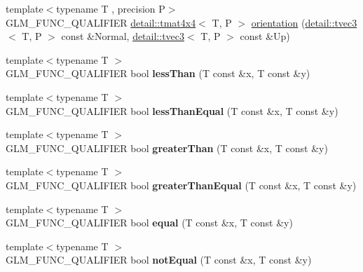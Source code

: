 \begin{DoxyCompactItemize}
\item 
{\footnotesize template$<$typename T , precision P$>$ }\\G\+L\+M\+\_\+\+F\+U\+N\+C\+\_\+\+Q\+U\+A\+L\+I\+F\+I\+ER \hyperlink{structglm_1_1detail_1_1tmat4x4}{detail\+::tmat4x4}$<$ T, P $>$ \hyperlink{group__gtx__rotate__vector_gac80aaf3b2af70c7f03f1077d4b6ac507}{orientation} (\hyperlink{structglm_1_1detail_1_1tvec3}{detail\+::tvec3}$<$ T, P $>$ const \&Normal, \hyperlink{structglm_1_1detail_1_1tvec3}{detail\+::tvec3}$<$ T, P $>$ const \&Up)
\item 
{\footnotesize template$<$typename T $>$ }\\G\+L\+M\+\_\+\+F\+U\+N\+C\+\_\+\+Q\+U\+A\+L\+I\+F\+I\+ER bool {\bfseries less\+Than} (T const \&x, T const \&y)\hypertarget{namespaceglm_a6f2a3cef357dbf21b5fc90aded289ba1}{}\label{namespaceglm_a6f2a3cef357dbf21b5fc90aded289ba1}

\item 
{\footnotesize template$<$typename T $>$ }\\G\+L\+M\+\_\+\+F\+U\+N\+C\+\_\+\+Q\+U\+A\+L\+I\+F\+I\+ER bool {\bfseries less\+Than\+Equal} (T const \&x, T const \&y)\hypertarget{namespaceglm_a299eb11fb67637d37144dc0fcc6c6ff3}{}\label{namespaceglm_a299eb11fb67637d37144dc0fcc6c6ff3}

\item 
{\footnotesize template$<$typename T $>$ }\\G\+L\+M\+\_\+\+F\+U\+N\+C\+\_\+\+Q\+U\+A\+L\+I\+F\+I\+ER bool {\bfseries greater\+Than} (T const \&x, T const \&y)\hypertarget{namespaceglm_ae567b870c79fb61cf069d489133eaf48}{}\label{namespaceglm_ae567b870c79fb61cf069d489133eaf48}

\item 
{\footnotesize template$<$typename T $>$ }\\G\+L\+M\+\_\+\+F\+U\+N\+C\+\_\+\+Q\+U\+A\+L\+I\+F\+I\+ER bool {\bfseries greater\+Than\+Equal} (T const \&x, T const \&y)\hypertarget{namespaceglm_a03e93d49cec76267c3e11fd68381639a}{}\label{namespaceglm_a03e93d49cec76267c3e11fd68381639a}

\item 
{\footnotesize template$<$typename T $>$ }\\G\+L\+M\+\_\+\+F\+U\+N\+C\+\_\+\+Q\+U\+A\+L\+I\+F\+I\+ER bool {\bfseries equal} (T const \&x, T const \&y)\hypertarget{namespaceglm_a9943cfbeef0a00a2becb541e9e3818ed}{}\label{namespaceglm_a9943cfbeef0a00a2becb541e9e3818ed}

\item 
{\footnotesize template$<$typename T $>$ }\\G\+L\+M\+\_\+\+F\+U\+N\+C\+\_\+\+Q\+U\+A\+L\+I\+F\+I\+ER bool {\bfseries not\+Equal} (T const \&x, T const \&y)\hypertarget{namespaceglm_ab4ee9100dc2b4e41ef91ff6898f979e2}{}\label{namespaceglm_ab4ee9100dc2b4e41ef91ff6898f979e2}


\end{DoxyCompactItemize}
